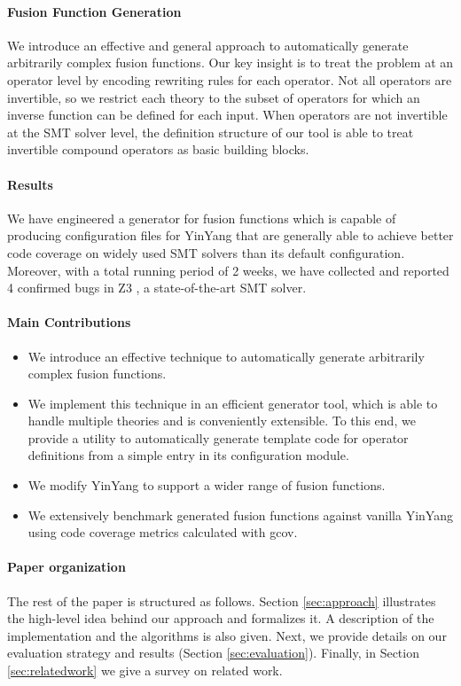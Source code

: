 \documentclass[sigplan,screen]{acmart}
\begin{document}
\paragraph{Fusion Function Generation} We introduce an effective and general approach to automatically generate arbitrarily complex fusion functions. Our key insight is to treat the problem at an operator level by encoding rewriting rules for each operator. Not all operators are invertible, so we restrict each theory to the subset of operators for which an inverse function can be defined for each input. When operators are not invertible at the SMT solver level, the definition structure of our tool is able to treat invertible compound operators as basic building blocks.

\paragraph{Results}
We have engineered a generator for fusion functions which is capable of producing configuration files for YinYang that are generally able to achieve better code coverage on widely used SMT solvers than its default configuration. Moreover, with a total running period of 2 weeks, we have collected and reported 4 confirmed bugs in Z3 \cite{z3}, a state-of-the-art SMT solver.

\paragraph{Main Contributions}
\begin{itemize}
    \item We introduce an effective technique to automatically generate arbitrarily complex fusion functions.
    \item We implement this technique in an efficient generator tool, which is able to handle multiple theories and is conveniently extensible. To this end, we provide a utility to automatically generate template code for operator definitions from a simple entry in its configuration module. 
    \item We modify YinYang to support a wider range of fusion functions.
    \item We extensively benchmark generated fusion functions against vanilla YinYang using code coverage metrics calculated with gcov.
\end{itemize}

\paragraph{Paper organization}
The rest of the paper is structured as follows. Section \ref{sec:approach} illustrates the high-level idea behind our approach and formalizes it. A description of the implementation and the algorithms is also given. Next, we provide details on our evaluation strategy and results (Section \ref{sec:evaluation}). Finally, in Section \ref{sec:relatedwork} we give a survey on related work. 
\end{document}
